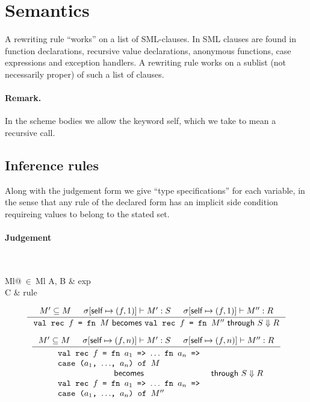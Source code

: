 
\section{Semantics}
A rewriting rule ``works'' on a list of SML-clauses. In SML clauses are found in
function declarations, recursive value declarations, anonymous functions, case
expressions and exception handlers. A rewriting rule works on a sublist (not
necessarily proper) of such a list of clauses.

\paragraph{Remark.} In the scheme bodies we allow the keyword \textsf{self},
which we take to mean a recursive call.

\subsection{Inference rules}
\newcommand{\becomesthrough}[3]{#1 \textsf{ becomes } #2 \textsf{ through } #3}

Along with the judgement form we give ``type specifications'' for each variable,
in the sense that any rule of the declared form has an implicit side condition
requireing values to belong to the stated set.

\paragraph{Judgement} \fbox{\becomesthrough{A}{B}{C}}\\
\indent\begin{tabular}{Ml@{$\ \in\ $}Ml}
  A, B & exp\\
  C & rule
\end{tabular}

\[
\inference
{
  M' \subseteq M &
  \sigma[\textsf{self} \mapsto (f, 1)] |- M' : S &
  \sigma[\textsf{self} \mapsto (f, 1)] |- M'' : R
}
{
  \becomesthrough
  {\texttt{val rec $f$ = fn $M$}}
  {\texttt{val rec $f$ = fn $M''$}}
  {S \Downarrow R}
}
\]

\[
\inference
{
  M' \subseteq M &
  \sigma[\textsf{self} \mapsto (f, n)] |- M' : S &
  \sigma[\textsf{self} \mapsto (f, n)] |- M'' : R
}
{
  \begin{array}{c}
    \begin{array}{l}
      \texttt{val rec $f$ = fn $a_1$ => $\ldots$ fn $a_n$ =>}\\
      \texttt{case ($a_1$, $\ldots$, $a_n$) of $M$}
    \end{array}\\
    \textsf{becomes}\\
    \begin{array}{l}
      \texttt{val rec $f$ = fn $a_1$ => $\ldots$ fn $a_n$ =>}\\
      \texttt{case ($a_1$, $\ldots$, $a_n$) of $M''$}
    \end{array}
  \end{array}
  \textsf{ through }
  S \Downarrow R
}
\]

